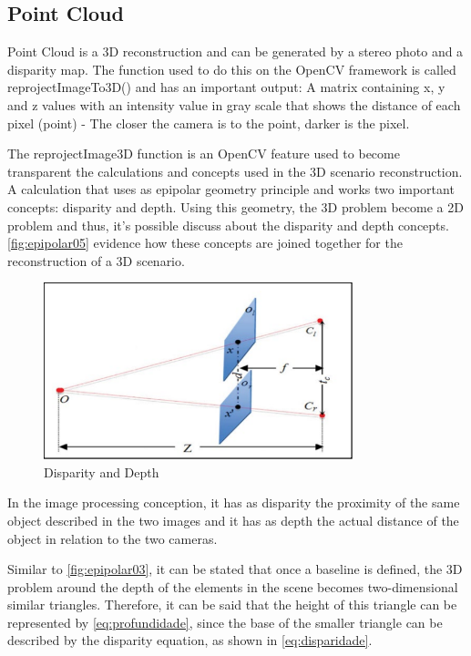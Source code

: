 \subsection{Point Cloud}

    Point Cloud is a 3D reconstruction and can be generated by a stereo photo and a disparity map. The function used to do this on the OpenCV framework is called reprojectImageTo3D() and has an important output: A matrix containing x, y and z values with an intensity value in gray scale that shows the distance of each pixel (point) - The closer the camera is to the point, darker is the pixel.
    
    The reprojectImage3D function is an OpenCV feature used to become transparent the calculations and concepts used in the 3D scenario reconstruction. A calculation that uses as epipolar geometry principle and works two important concepts: disparity and depth. Using this geometry, the 3D problem become a 2D problem and thus, it's possible discuss about the disparity and depth concepts. \autoref{fig:epipolar05} evidence how these concepts are joined together for the reconstruction of a 3D scenario.

    \begin{figure}[H]
     \caption{\label{fig:epipolar05}
Disparity and Depth}
     \begin{center}
        \includegraphics[width=0.8\textwidth]{images/mapaDisparidade.png}
     \end{center}
    \end{figure}
    
    In the image processing conception, it has as disparity the proximity of the same object described in the two images and it has as depth the actual distance of the object in relation to the two cameras.
    
    Similar to \autoref{fig:epipolar03}, it can be stated that once a baseline is defined, the 3D problem around the depth of the elements in the scene becomes two-dimensional similar triangles. Therefore, it can be said that the height of this triangle can be represented by \autoref{eq:profundidade}, since the base of the smaller triangle can be described by the disparity equation, as shown in \autoref{eq:disparidade}.    
    
